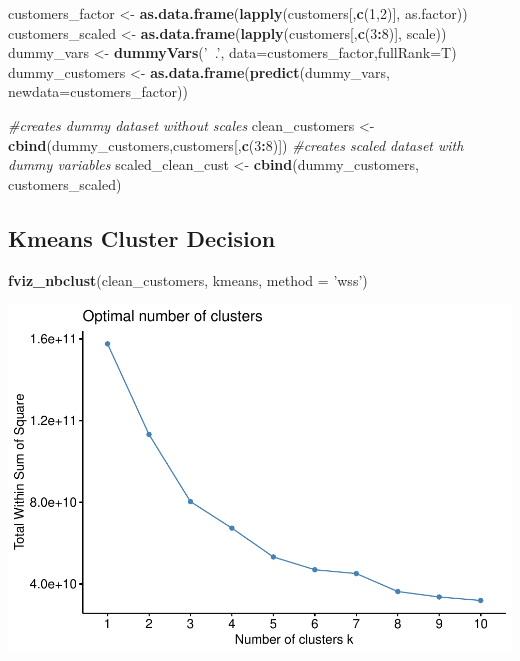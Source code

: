 \documentclass[
  english,
  man]{apa6}
\newenvironment{Shaded}{\begin{snugshade}}{\end{snugshade}}
\newcommand{\CommentTok}[1]{\textcolor[rgb]{0.56,0.35,0.01}{\textit{#1}}}
\newcommand{\DataTypeTok}[1]{\textcolor[rgb]{0.13,0.29,0.53}{#1}}
\newcommand{\DecValTok}[1]{\textcolor[rgb]{0.00,0.00,0.81}{#1}}
\newcommand{\KeywordTok}[1]{\textcolor[rgb]{0.13,0.29,0.53}{\textbf{#1}}}
\newcommand{\NormalTok}[1]{#1}
\newcommand{\OperatorTok}[1]{\textcolor[rgb]{0.81,0.36,0.00}{\textbf{#1}}}
\newcommand{\StringTok}[1]{\textcolor[rgb]{0.31,0.60,0.02}{#1}}
\begin{document}
\begin{Shaded}
\begin{Highlighting}[]
\NormalTok{customers_factor <-}\StringTok{ }\KeywordTok{as.data.frame}\NormalTok{(}\KeywordTok{lapply}\NormalTok{(customers[,}\KeywordTok{c}\NormalTok{(}\DecValTok{1}\NormalTok{,}\DecValTok{2}\NormalTok{)], as.factor))}
\NormalTok{customers_scaled <-}\StringTok{ }\KeywordTok{as.data.frame}\NormalTok{(}\KeywordTok{lapply}\NormalTok{(customers[,}\KeywordTok{c}\NormalTok{(}\DecValTok{3}\OperatorTok{:}\DecValTok{8}\NormalTok{)], scale))}
\NormalTok{dummy_vars <-}\StringTok{ }\KeywordTok{dummyVars}\NormalTok{(}\StringTok{'~.'}\NormalTok{, }\DataTypeTok{data=}\NormalTok{customers_factor,}\DataTypeTok{fullRank=}\NormalTok{T)}
\NormalTok{dummy_customers <-}\StringTok{ }\KeywordTok{as.data.frame}\NormalTok{(}\KeywordTok{predict}\NormalTok{(dummy_vars, }\DataTypeTok{newdata=}\NormalTok{customers_factor))}

\CommentTok{#creates dummy dataset without scales}
\NormalTok{clean_customers <-}\StringTok{ }\KeywordTok{cbind}\NormalTok{(dummy_customers,customers[,}\KeywordTok{c}\NormalTok{(}\DecValTok{3}\OperatorTok{:}\DecValTok{8}\NormalTok{)]) }
\CommentTok{#creates scaled dataset with dummy variables}
\NormalTok{scaled_clean_cust <-}\StringTok{ }\KeywordTok{cbind}\NormalTok{(dummy_customers, customers_scaled) }
\end{Highlighting}
\end{Shaded}

\hypertarget{kmeans-cluster-decision}{%
\subsection{Kmeans Cluster Decision}\label{kmeans-cluster-decision}}

\begin{Shaded}
\begin{Highlighting}[]
\KeywordTok{fviz_nbclust}\NormalTok{(clean_customers, kmeans, }\DataTypeTok{method =} \StringTok{'wss'}\NormalTok{)}
\end{Highlighting}
\end{Shaded}

\includegraphics{MSDS680-Week-6-Kmeans-and-HCA_files/figure-latex/kmeans investigation-1.pdf}
\end{document}
